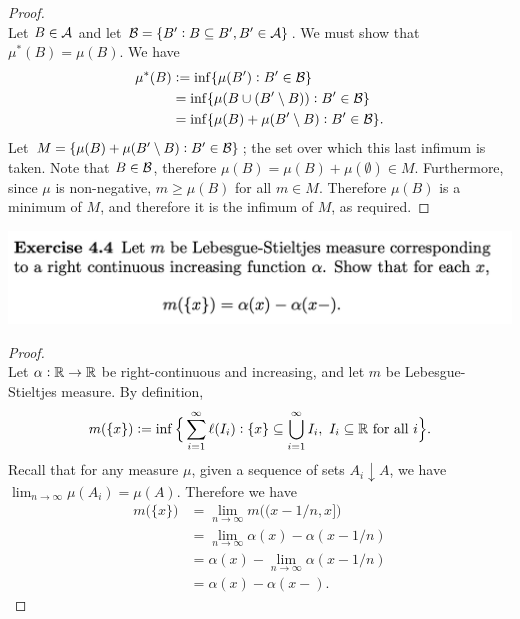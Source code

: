 \begin{proof}~\\
  Let $B \in \mathcal A$ and let $\mathcal B = \{B' : B \subseteq B', B' \in \mathcal A\}$. We must show
  that $\mu^*(B) = \mu(B)$. We have
  \begin{align*}
    \mu^*(B)
    &:= \inf \{\mu(B') : B' \in \mathcal B\} \\
    &=  \inf \{\mu(B \cup (B' \setminus B)) : B' \in \mathcal B\} \\
    &=  \inf \{\mu(B) + \mu(B' \setminus B) : B' \in \mathcal B\}.
  \end{align*}
  Let $M = \{\mu(B) + \mu(B' \setminus B) : B' \in \mathcal B\}$; the set over which this last infimum is taken.
  Note that $B \in \mathcal B$, therefore $\mu(B) = \mu(B) + \mu(\emptyset) \in M$. Furthermore, since $\mu$ is
  non-negative, $m \geq \mu(B)$ for all $m \in M$. Therefore $\mu(B)$ is a minimum of $M$, and therefore it is
  the infimum of $M$, as required.
\end{proof}

\newpage
\begin{mdframed}
\includegraphics[width=400pt]{img/analysis--berkeley-202a-hw04-c0b6.png}
\end{mdframed}

\begin{proof}~\\
  Let $\alpha: \mathbb{R} \to \mathbb{R}$ be right-continuous and increasing, and let $m$ be Lebesgue-Stieltjes measure. By
  definition,
  \begin{align*}
    m(\{x\}) := \inf \Big\{\sum_{i=1}^\infty \ell(I_i) : \{x\} \subseteq \bigcup_{i=1}^\infty I_i, ~ I_i \subseteq \mathbb{R} \text{~for all~}i\Big\}.
  \end{align*}
  Recall that for any measure $\mu$, given a sequence of sets $A_i \downarrow A$, we
  have $\lim_{n\to\infty} \mu(A_i) = \mu(A)$. Therefore we have
  \begin{align*}
    m\big(\{x\}\big)
    &= \lim_{n\to\infty} m\big((x - 1/n, x]\big) \\
    &= \lim_{n\to\infty} \alpha(x) - \alpha(x - 1/n) \\
    &= \alpha(x) - \lim_{n\to\infty} \alpha(x - 1/n) \\
    &= \alpha(x) - \alpha(x-).
  \end{align*}
\end{proof}




























